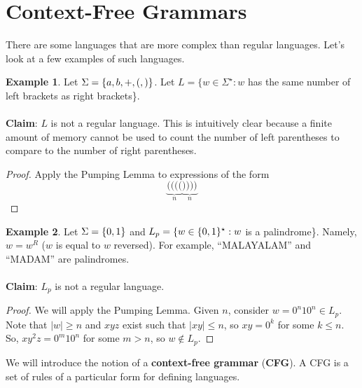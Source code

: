 \documentclass[]{article}
\DeclarePairedDelimiter{\set}{\lbrace}{\rbrace}
\theoremstyle{definition}
\newtheorem{ex}{Example}[section]
\newcommand{\lecture}[1]{\marginpar{{\footnotesize $\leftarrow$ \underline{#1}}}}
\begin{document}
  \section{Context-Free Grammars} \lecture{October 15, 2013}
    There are some languages that are more complex than regular languages. Let's look at a few examples of such languages.

    \begin{ex}
      Let $\Sigma = \set{a, b, +, (, )}$. Let $L = \{w  \in \Sigma^\star : w $ has the same number of left brackets as right brackets\}.
      \\ \\
      \textbf{Claim}: $L$ is not a regular language. This is intuitively clear because a finite amount of memory cannot be used to count the number of left parentheses to compare to the number of right parentheses.

      \begin{proof}
        Apply the Pumping Lemma to expressions of the form
        $$
          \underbrace{((((}_{n} \underbrace{))))}_{n}
        $$
      \end{proof}
    \end{ex}

    \begin{ex}
      Let $\Sigma = \set{0, 1}$ and $L_p = \{w \in \set{0, 1}^\star : w $ is a palindrome\}. Namely, $w = w^R$ ($w$ is equal to $w$ reversed). For example, ``MALAYALAM'' and ``MADAM'' are palindromes.
      \\ \\
      \textbf{Claim}: $L_p$ is not a regular language.

      \begin{proof}
        We will apply the Pumping Lemma. Given $n$, consider $w = 0^n 1 0^n \in L_p$. Note that $|w| \ge n$ and $xyz$ exist such that $|xy| \le n$, so $xy = 0^k$ for some $k \le n$. So, $xy^2z = 0^m 1 0^n$ for some $m > n$, so $w \not \in L_p$.
      \end{proof}
    \end{ex}

    We will introduce the notion of a \textbf{context-free grammar} (\textbf{CFG}). A CFG is a set of rules of a particular form for defining languages.
\end{document}
